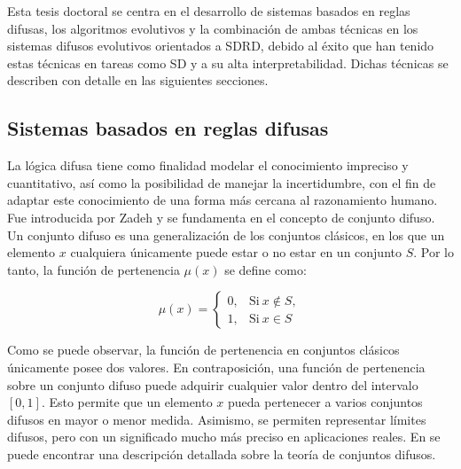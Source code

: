 \documentclass[c5paper,10pt,twoside]{book}	   	%
\begin{document}
Esta tesis doctoral se centra en el desarrollo de sistemas basados en reglas difusas, los algoritmos evolutivos y la combinación de ambas técnicas en los sistemas difusos evolutivos orientados a \ac{SDRD}, debido al éxito que han tenido estas técnicas en tareas como \ac{SD} y a su alta interpretabilidad. Dichas técnicas se describen con detalle en las siguientes secciones.

\subsection{Sistemas basados en reglas difusas}

La lógica difusa tiene como finalidad modelar el conocimiento impreciso y cuantitativo, así como la posibilidad de manejar la incertidumbre, con el fin de adaptar este conocimiento de una forma más cercana al razonamiento humano. Fue introducida por Zadeh \cite{Zad65,Zad75} y se fundamenta en el concepto de conjunto difuso. Un conjunto difuso es una generalización de los conjuntos clásicos, en los que un elemento $x$ cualquiera únicamente puede estar o no estar en un conjunto $S$. Por lo tanto, la función de pertenencia $\mu(x)$ se define como:

\begin{equation}
\mu(x) = 
\begin{cases}
0, & \text{Si}\ x \notin S, \\
1, & \text{Si}\ x \in S
\end{cases}
\label{eq:pertenecia}
\end{equation}

Como se puede observar, la función de pertenencia en conjuntos clásicos únicamente posee dos valores. En contraposición, una función de pertenencia sobre un conjunto difuso puede adquirir cualquier valor dentro del intervalo $[0,1]$. Esto permite que un elemento $x$ pueda pertenecer a varios conjuntos difusos en mayor o menor medida. Asimismo, se permiten representar límites difusos, pero con un significado mucho más preciso en aplicaciones reales. En \cite{Ky95} se puede encontrar una descripción detallada sobre la teoría de conjuntos difusos.
\end{document}
